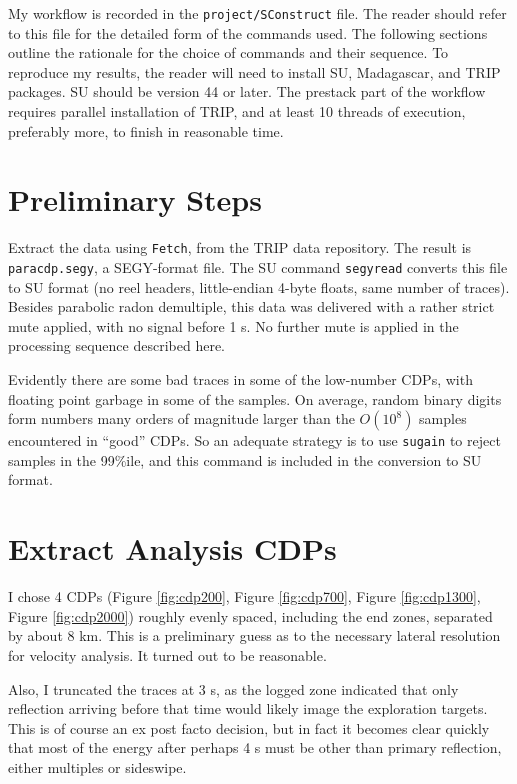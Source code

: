 My workflow is recorded in the {\tt project/SConstruct} file. The reader should refer to this file for the detailed form of the commands used. The following sections outline the rationale for the choice of commands and their sequence. To reproduce my results, the reader will need to install SU, Madagascar, and TRIP packages. SU should be version 44 or later. The prestack part of the workflow requires parallel installation of TRIP, and at least 10 threads of execution, preferably more, to finish in reasonable time. 

\section{Preliminary Steps}
Extract the data using {\tt Fetch}, from the TRIP data repository. The result is {\tt paracdp.segy}, a SEGY-format file. The SU command {\tt segyread} converts this file to SU format (no reel headers, little-endian 4-byte floats, same number of traces). Besides parabolic radon demultiple, this data was delivered with a rather strict mute applied, with no signal before 1 s. No further mute is applied in the processing sequence described here. 

Evidently there are some bad traces in some of the low-number CDPs, with floating point garbage in some of the samples. On average, random binary digits form numbers many orders of magnitude larger than the $O(10^8)$ samples encountered in ``good'' CDPs. So an adequate strategy is to use {\tt sugain} to reject samples in the 99\%ile, and this command is included in the conversion to SU format.

\section{Extract Analysis CDPs}
I chose 4 CDPs (Figure \ref{fig:cdp200}, Figure \ref{fig:cdp700}, Figure \ref{fig:cdp1300}, Figure \ref{fig:cdp2000}) roughly evenly spaced, including the end zones, separated by about 8 km. This is a preliminary guess as to the necessary lateral resolution for velocity analysis. It turned out to be reasonable. 

Also, I truncated the traces at 3 s, as the logged zone indicated that only reflection arriving before that time would likely image the exploration targets. This is of course an ex post facto decision, but in fact it becomes clear quickly that most of the energy after perhaps 4 s must be other than primary reflection, either multiples or sideswipe.

